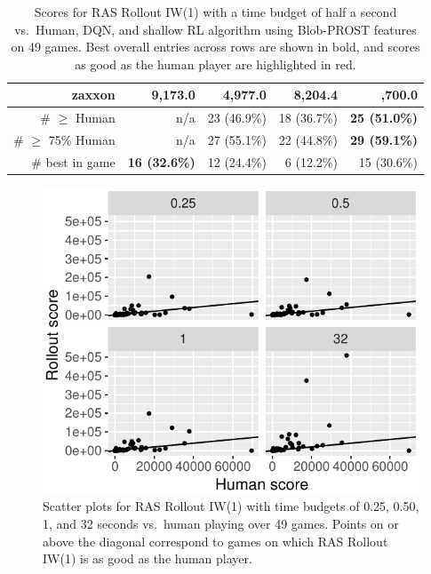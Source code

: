 \documentclass[letterpaper]{article}
\begin{document}
\begin{table}[t]
{\begin{tabular}{@{}rrrrr@{}}
\large                  zaxxon &      9,173.0 &       4,977.0 &         8,204.4 &\bf\B        18,700.0 \\ %
\midrule
\large         \# $\geq$ Human &          n/a &   23 (46.9\%) &     18 (36.7\%) &\bf       25 (51.0\%) \\ %
\large    \# $\geq$ 75\% Human &          n/a &   27 (55.1\%) &     22 (44.8\%) &\bf       29 (59.1\%) \\ %
\midrule
\large         \# best in game &\bf 16 (32.6\%) & 12 (24.4\%) &      6 (12.2\%) &          15 (30.6\%) \\ %
\bottomrule
\end{tabular}
}
\caption{Scores for RAS Rollout IW(1) with a time budget of half a second vs.\ Human, DQN,
and shallow RL algorithm using Blob-PROST features on 49 games.
Best overall entries across rows are shown in bold, and scores as good as the human player
are highlighted in red.
}
\label{table:narrow}
\end{table}


\begin{figure}[t]
\centering
\includegraphics[width=.95\columnwidth]{110-15-halfsec}
\caption{Scatter plots for RAS Rollout IW(1) with time budgets of 0.25, 0.50, 1, and 32
seconds vs.\ human playing over 49 games.
Points on or above the diagonal correspond to games on which RAS Rollout IW(1) is as
good as the human player.
}
\label{fig:110:scatter}
\end{figure}
\end{document}
